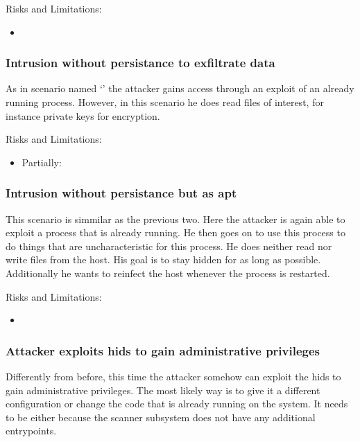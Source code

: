 Risks and Limitations:
\begin{itemize}
	\item {}
\end{itemize}

\subsubsection{Intrusion without persistance to exfiltrate data}
\label{sec:attack:nopersistanceexfiltration}

As in scenario named `' the attacker gains access through an exploit of an already running process. However, in this scenario he does read files of interest, for instance private keys for encryption. 

Risks and Limitations:
\begin{itemize}
	\item Partially: 
\end{itemize}

\subsubsection{Intrusion without persistance but as apt}
\label{sec:attack:nopersistanceapt}

This scenario is simmilar as the previous two. Here the attacker is again able to exploit a process that is already running. He then goes on to use this process to do things that are uncharacteristic for this process. He does neither read nor write files from the host. His goal is to stay hidden for as long as possible. Additionally he wants to reinfect the host whenever the process is restarted.

Risks and Limitations:
\begin{itemize}
	\item {}
\end{itemize}

\subsubsection{Attacker exploits \gls{hids} to gain administrative privileges}
\label{sec:attack:exploitforroot}

Differently from before, this time the attacker somehow can exploit the \gls{hids} to gain administrative privileges. The most likely way is to give it a different configuration or change the code that is already running on the system. It needs to be either because the scanner subsystem does not have any additional entrypoints.


